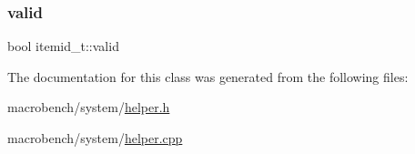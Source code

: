 \mbox{\label{classitemid__t_aa66b0fad35eaa15fe8de5c6d02a18050}} 
\subsubsection{\texorpdfstring{valid}{valid}}
{\footnotesize\ttfamily bool itemid\+\_\+t\+::valid}



The documentation for this class was generated from the following files\+:\begin{DoxyCompactItemize}
\item 
macrobench/system/\hyperlink{helper_8h}{helper.\+h}\item 
macrobench/system/\hyperlink{helper_8cpp}{helper.\+cpp}\end{DoxyCompactItemize}
